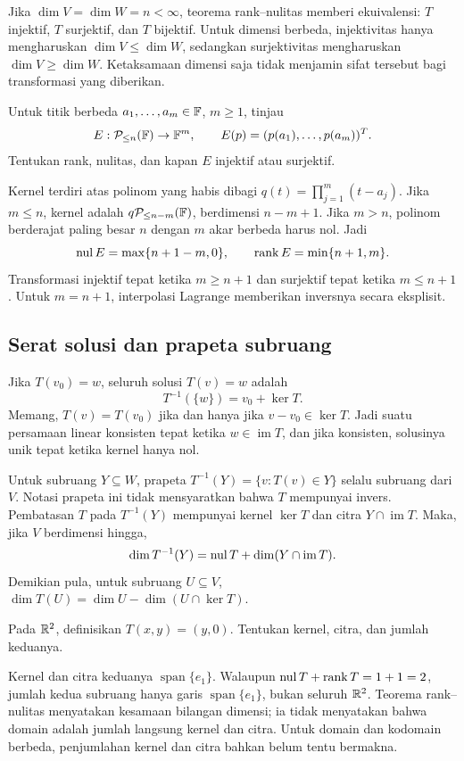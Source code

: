 Jika $\dim V=\dim W=n<\infty$, teorema rank--nulitas memberi
ekuivalensi: $T$ injektif, $T$ surjektif, dan $T$ bijektif.
Untuk dimensi berbeda, injektivitas hanya mengharuskan
$\dim V\le\dim W$, sedangkan surjektivitas mengharuskan
$\dim V\ge\dim W$. Ketaksamaan dimensi saja tidak menjamin
sifat tersebut bagi transformasi yang diberikan.

\begin{exam}
    Untuk titik berbeda $a_1,\ldots,a_m\in\mathbb{F}$, $m\ge1$, tinjau
    \[
        E:\mathcal P_{\le n}(\mathbb{F})\to\mathbb{F}^m,\qquad
        E(p)=(p(a_1),\ldots,p(a_m))^T.
    \]
    Tentukan rank, nulitas, dan kapan $E$ injektif atau surjektif.
\end{exam}
\begin{solution}
    Kernel terdiri atas polinom yang habis dibagi
    $q(t)=\prod_{j=1}^m(t-a_j)$.
    Jika $m\le n$, kernel adalah
    $q\mathcal P_{\le n-m}(\mathbb{F})$, berdimensi $n-m+1$.
    Jika $m>n$, polinom berderajat paling besar $n$ dengan
    $m$ akar berbeda harus nol. Jadi
    \[
        \operatorname{nul} E=\max\{n+1-m,0\},\qquad
        \operatorname{rank} E=\min\{n+1,m\}.
    \]
    Transformasi injektif tepat ketika $m\ge n+1$ dan surjektif
    tepat ketika $m\le n+1$. Untuk $m=n+1$, interpolasi
    Lagrange memberikan inversnya secara eksplisit.
\end{solution}

\subsection{Serat solusi dan prapeta subruang}
Jika $T(v_0)=w$, seluruh solusi $T(v)=w$ adalah
\[
    T^{-1}(\{w\})=v_0+\ker T.
\]
Memang, $T(v)=T(v_0)$ jika dan hanya jika $v-v_0\in\ker T$.
Jadi suatu persamaan linear konsisten tepat ketika
$w\in\operatorname{im}T$, dan jika konsisten, solusinya unik
tepat ketika kernel hanya nol.

Untuk subruang $Y\subseteq W$, prapeta
$T^{-1}(Y)=\{v:T(v)\in Y\}$ selalu subruang dari $V$.
Notasi prapeta ini tidak mensyaratkan bahwa $T$ mempunyai invers.
Pembatasan $T$ pada $T^{-1}(Y)$ mempunyai kernel $\ker T$
dan citra $Y\cap\operatorname{im}T$. Maka, jika $V$ berdimensi hingga,
\[
    \dim T^{-1}(Y)=\operatorname{nul} T+\dim(Y\cap\operatorname{im}T).
\]
Demikian pula, untuk subruang $U\subseteq V$,
$\dim T(U)=\dim U-\dim(U\cap\ker T)$.

\begin{exam}
    Pada $\mathbb{R}^2$, definisikan $T(x,y)=(y,0)$.
    Tentukan kernel, citra, dan jumlah keduanya.
\end{exam}
\begin{solution}
    Kernel dan citra keduanya $\operatorname{span}\{e_1\}$.
    Walaupun $\operatorname{nul} T+\operatorname{rank} T=1+1=2$, jumlah kedua subruang
    hanya garis $\operatorname{span}\{e_1\}$, bukan seluruh $\mathbb{R}^2$.
    Teorema rank--nulitas menyatakan kesamaan bilangan dimensi;
    ia tidak menyatakan bahwa domain adalah jumlah langsung
    kernel dan citra. Untuk domain dan kodomain berbeda,
    penjumlahan kernel dan citra bahkan belum tentu bermakna.
\end{solution}

